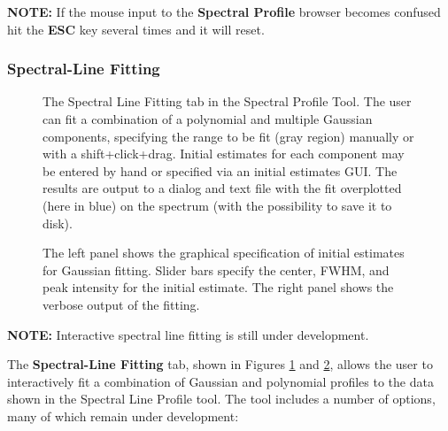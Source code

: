 {\bf NOTE:} If the mouse input to the {\bf Spectral Profile} browser becomes confused hit the {\bf ESC} key several times and it will reset.

\subsubsection{Spectral-Line Fitting}
\label{section:display.image.specprof.specfit}

\begin{figure}[h!]
\begin{center}
\caption{\label{fig:viewer_specproffit} The Spectral Line Fitting tab in the 
Spectral Profile Tool. The user can fit a combination of a polynomial and multiple Gaussian components,
specifying the range to be fit (gray region) manually or with a shift+click+drag. Initial estimates for each component
may be entered by hand or specified via an initial estimates GUI. The results are output to a dialog and text file with
the fit overplotted (here in blue) on the spectrum (with the possibility to save it to disk).}
\end{center}
\end{figure}

\begin{figure}[h!]
\begin{center}
\caption{\label{fig:viewer_specproffit_2} The left panel shows the graphical specification of initial estimates for Gaussian fitting.
Slider bars specify the center, FWHM, and peak intensity for the initial estimate. The right panel shows the verbose output of
the fitting.}
\hrulefill
\end{center}
\end{figure}

{\bf NOTE:} Interactive spectral line fitting is still under development.

The {\bf Spectral-Line Fitting} tab, shown in Figures \ref{fig:viewer_specproffit} and \ref{fig:viewer_specproffit_2}, 
allows the user to interactively fit a combination of Gaussian and polynomial profiles to the data shown 
in the Spectral Line Profile tool. The tool includes a number of options, many of which remain under
development:

